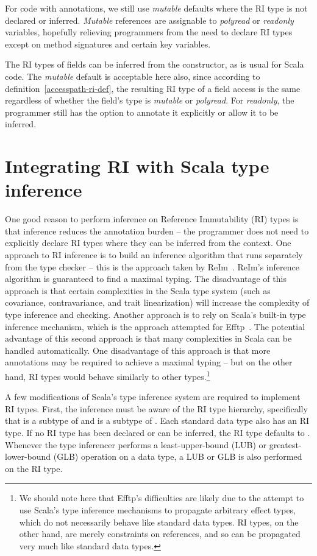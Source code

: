 For code with annotations, we still use \emph{mutable} defaults
where the RI type is not declared or inferred.
\emph{Mutable} references are assignable to \emph{polyread} or \emph{readonly}
variables, hopefully relieving programmers from the need to declare RI types
except on method signatures and certain key variables.

The RI types of fields can be inferred from the constructor, as is usual
for Scala code.
The \emph{mutable} default is acceptable here also, since according to
definition~\ref{accesspath-ri-def}, the resulting RI type of a field access
is the same regardless of whether the field's type is \emph{mutable} or \emph{polyread}.
For \emph{readonly}, the programmer still has the option to annotate it explicitly
or allow it to be inferred.

\section{Integrating RI with Scala type inference}

One good reason to perform inference on Reference Immutability (RI) types is that inference
reduces the annotation burden -- the programmer does not need to
explicitly declare RI types where they can be inferred from the context.
One approach to RI inference is to build an inference algorithm that runs
separately from the type checker -- this is the approach taken by ReIm~\cite{reim}.
ReIm's inference algorithm is guaranteed to find a maximal typing.
The disadvantage of this approach is that certain complexities
in the Scala type system (such as covariance, contravariance, and trait linearization)
will increase the complexity of type inference and checking.
Another approach is to rely on Scala's built-in type inference mechanism,
which is the approach attempted for Efftp~\cite{efftp}.
The potential advantage of this second approach is that many complexities
in Scala can be handled automatically.
One disadvantage of this approach is that more annotations may be required to
achieve a maximal typing -- but on the other hand, RI types would behave
similarly to other types.\footnote{We should note here that Efftp's difficulties are
likely due to the attempt to use Scala's type inference mechanisms to
propagate arbitrary effect types, which do not necessarily
behave like standard data types. RI types, on the other hand, are merely constraints
on references, and so can be propagated very much like standard data types.}

A few modifications of Scala's type inference system are required to implement
RI types.
First, the inference must be aware of the RI type hierarchy,
specifically that  is a subtype of  and
 is a subtype of .
Each standard data type also has an RI type.
If no RI type has been declared or can be inferred, the RI type defaults to .
Whenever the type inferencer performs a least-upper-bound (LUB) or
greatest-lower-bound (GLB) operation on a data type, a LUB or GLB is also performed
on the RI type.

